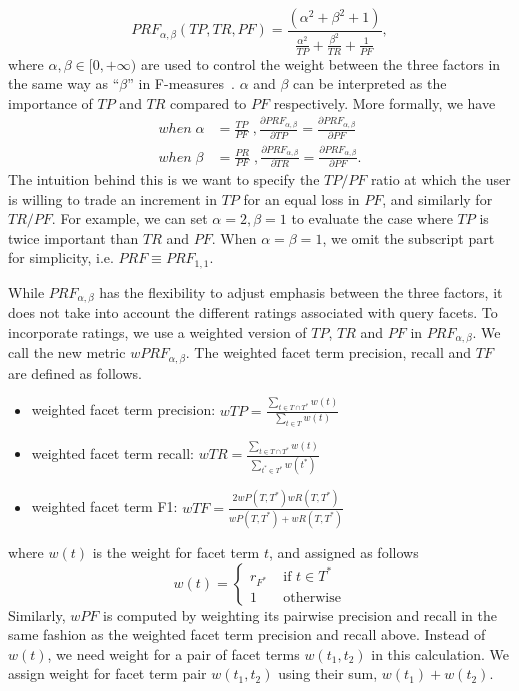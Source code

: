\begin{equation}
\label{eq:prf}
 P\!R\!F_{\alpha,\beta}(T\!P, T\!R, P\!F) = \frac{(\alpha^2 + \beta^2 + 1)}{\frac{\alpha^2}{T\!P} + \frac{\beta^2}{T\!R} + \frac{1}{P\!F}},
\end{equation}
where $\alpha,\beta \in [0,+\infty)$ are used to control the weight between the three factors in the same way as ``$\beta$'' in F-measures~\cite{van1979information}. $\alpha$ and $\beta$ can be interpreted as the importance of $T\!P$ and $T\!R$ compared to $P\!F$ respectively. More formally, we have 
\begin{equation}
\begin{split} 
 when\; \alpha &= \frac{T\!P}{P\!F} \;, \frac{\partial P\!R\!F_{\alpha,\beta}}{\partial T\!P} = \frac{\partial P\!R\!F_{\alpha,\beta}}{\partial P\!F}\\
 when\; \beta &= \frac{P\!R}{P\!F} \;, \frac{\partial P\!R\!F_{\alpha,\beta}}{\partial T\!R} = \frac{\partial P\!R\!F_{\alpha,\beta}}{\partial P\!F}.
\end{split}
\end{equation}
The intuition behind this is we want to specify the $T\!P/P\!F$ ratio at which the user is willing to trade an increment in $T\!P$ for an equal loss in $P\!F$, and similarly for $T\!R/P\!F$. For example, we can set $\alpha\!=\!2,\beta\!=\!1$ to evaluate the case where $T\!P$ is twice important than $T\!R$ and $P\!F$. When $\alpha \!=\! \beta \!=\! 1$, we omit the subscript part for simplicity, i.e. $PRF \equiv PRF_{1,1}$.

While $PRF_{\alpha,\beta}$ has the flexibility to adjust emphasis between the three factors, it does not take into account the different ratings associated with query facets. To incorporate ratings, we use a weighted version of $T\!P$, $T\!R$ and $P\!F$ in $PRF_{\alpha,\beta}$. We call the new metric $wPRF_{\alpha,\beta}$. The weighted facet term precision, recall and $T\!F$ are defined as follows.
\begin{itemize}
 \item weighted facet term precision: $wT\!P=\frac{\sum_{t \in T \cap T^*}{w(t)}}{\sum_{t \in T}{w(t)}}$
 \item weighted facet term recall: $wT\!R=\frac{\sum_{t \in T \cap T^*}{w(t)}}{\sum_{t^* \in T^*}{w(t^*)}}$ 
  \item weighted facet term F1: $wT\!F=\frac{2wP(T,T^*)wR(T,T^*)}{wP(T,T^*)+wR(T,T^*)}$ 
\end{itemize}
where $w(t)$ is the weight for facet term $t$, and assigned as follows
$$
w(t) = \left\{ \begin{array}{rl}
r_{F^*} &\mbox{ if $t \in T^*$} \\
1 &\mbox{ otherwise}
\end{array} \right.
$$
Similarly, $wP\!F$ is computed by weighting its pairwise precision and recall in the same fashion as the weighted facet term precision and recall above.
Instead of $w(t)$, we need weight for a pair of facet terms $w(t_1,t_2)$ in this calculation.
We assign weight for facet term pair $w(t_1, t_2)$ using their sum, $w(t_1) + w(t_2)$.


